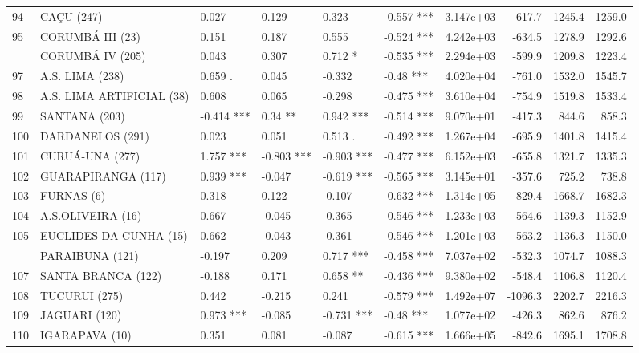 \documentclass[12pt,oneside]{book}\usepackage[]{graphicx}\usepackage[]{color}
\newenvironment{knitrout}{}{} %
\theoremstyle{definition} %
\begin{document}
\begin{knitrout}
\begin{table}
{\begin{tabular}[t]{llllllrrrr}
94 & CAÇU (247) & 0.027 & 0.129 & 0.323 & -0.557 *** & 3.147e+03 & -617.7 & 1245.4 & 1259.0\\
\rowcolor{gray!6}  95 & CORUMBÁ III (23) & 0.151 & 0.187 & 0.555 & -0.524 *** & 4.242e+03 & -634.5 & 1278.9 & 1292.6\\
\addlinespace
96 & CORUMBÁ IV (205) & 0.043 & 0.307 & 0.712 * & -0.535 *** & 2.294e+03 & -599.9 & 1209.8 & 1223.4\\
\rowcolor{gray!6}  97 & A.S. LIMA (238) & 0.659 . & 0.045 & -0.332 & -0.48 *** & 4.020e+04 & -761.0 & 1532.0 & 1545.7\\
98 & A.S. LIMA ARTIFICIAL (38) & 0.608 & 0.065 & -0.298 & -0.475 *** & 3.610e+04 & -754.9 & 1519.8 & 1533.4\\
\rowcolor{gray!6}  99 & SANTANA (203) & -0.414 *** & 0.34 ** & 0.942 *** & -0.514 *** & 9.070e+01 & -417.3 & 844.6 & 858.3\\
100 & DARDANELOS (291) & 0.023 & 0.051 & 0.513 . & -0.492 *** & 1.267e+04 & -695.9 & 1401.8 & 1415.4\\
\addlinespace
\rowcolor{gray!6}  101 & CURUÁ-UNA (277) & 1.757 *** & -0.803 *** & -0.903 *** & -0.477 *** & 6.152e+03 & -655.8 & 1321.7 & 1335.3\\
102 & GUARAPIRANGA (117) & 0.939 *** & -0.047 & -0.619 *** & -0.565 *** & 3.145e+01 & -357.6 & 725.2 & 738.8\\
\rowcolor{gray!6}  103 & FURNAS (6) & 0.318 & 0.122 & -0.107 & -0.632 *** & 1.314e+05 & -829.4 & 1668.7 & 1682.3\\
104 & A.S.OLIVEIRA (16) & 0.667 & -0.045 & -0.365 & -0.546 *** & 1.233e+03 & -564.6 & 1139.3 & 1152.9\\
\rowcolor{gray!6}  105 & EUCLIDES DA CUNHA (15) & 0.662 & -0.043 & -0.361 & -0.546 *** & 1.201e+03 & -563.2 & 1136.3 & 1150.0\\
\addlinespace
106 & PARAIBUNA (121) & -0.197 & 0.209 & 0.717 *** & -0.458 *** & 7.037e+02 & -532.3 & 1074.7 & 1088.3\\
\rowcolor{gray!6}  107 & SANTA BRANCA (122) & -0.188 & 0.171 & 0.658 ** & -0.436 *** & 9.380e+02 & -548.4 & 1106.8 & 1120.4\\
108 & TUCURUI (275) & 0.442 & -0.215 & 0.241 & -0.579 *** & 1.492e+07 & -1096.3 & 2202.7 & 2216.3\\
\rowcolor{gray!6}  109 & JAGUARI (120) & 0.973 *** & -0.085 & -0.731 *** & -0.48 *** & 1.077e+02 & -426.3 & 862.6 & 876.2\\
110 & IGARAPAVA (10) & 0.351 & 0.081 & -0.087 & -0.615 *** & 1.666e+05 & -842.6 & 1695.1 & 1708.8\\

\end{tabular}}
\end{table}
\end{knitrout}
\end{document}

